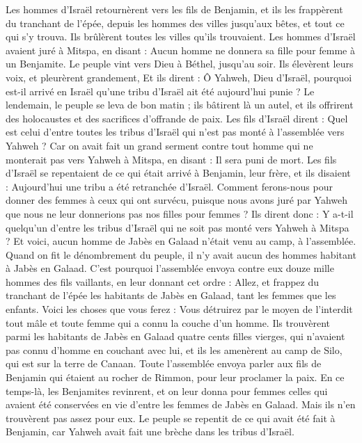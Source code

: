 \begin{multicols}{2}
Les hommes d'Israël retournèrent vers les fils de Benjamin, et ils les frappèrent du tranchant de l'épée, depuis les hommes des villes jusqu'aux bêtes, et tout ce qui s'y trouva. Ils brûlèrent toutes les villes qu'ils trouvaient.
\VerseOne{}Les hommes d'Israël avaient juré à Mitspa, en disant : Aucun homme ne donnera sa fille pour femme à un Benjamite.
Le peuple vint vers Dieu à Béthel, jusqu'au soir. Ils élevèrent leurs voix, et pleurèrent grandement,
Et ils dirent : Ô Yahweh, Dieu d'Israël, pourquoi est-il arrivé en Israël qu'une tribu d'Israël ait été aujourd'hui punie ?
Le lendemain, le peuple se leva de bon matin ; ils bâtirent là un autel, et ils offrirent des holocaustes et des sacrifices d'offrande de paix.
Les fils d'Israël dirent : Quel est celui d'entre toutes les tribus d'Israël qui n'est pas monté à l'assemblée vers Yahweh ? Car on avait fait un grand serment contre tout homme qui ne monterait pas vers Yahweh à Mitspa, en disant : Il sera puni de mort.
Les fils d'Israël se repentaient de ce qui était arrivé à Benjamin, leur frère, et ils disaient : Aujourd'hui une tribu a été retranchée d'Israël.
Comment ferons-nous pour donner des femmes à ceux qui ont survécu, puisque nous avons juré par Yahweh que nous ne leur donnerions pas nos filles pour femmes ?
Ils dirent donc : Y a-t-il quelqu'un d'entre les tribus d'Israël qui ne soit pas monté vers Yahweh à Mitspa ? Et voici, aucun homme de Jabès en Galaad n'était venu au camp, à l'assemblée.
Quand on fit le dénombrement du peuple, il n'y avait aucun des hommes habitant à Jabès en Galaad.
C'est pourquoi l'assemblée envoya contre eux douze mille hommes des fils vaillants, en leur donnant cet ordre : Allez, et frappez du tranchant de l'épée les habitants de Jabès en Galaad, tant les femmes que les enfants.
Voici les choses que vous ferez : Vous détruirez par le moyen de l'interdit tout mâle et toute femme qui a connu la couche d'un homme.
Ils trouvèrent parmi les habitants de Jabès en Galaad quatre cents filles vierges, qui n'avaient pas connu d'homme en couchant avec lui, et ils les amenèrent au camp de Silo, qui est sur la terre de Canaan.
Toute l'assemblée envoya parler aux fils de Benjamin qui étaient au rocher de Rimmon,  pour leur proclamer la paix.
En ce temps-là, les Benjamites revinrent, et on leur donna pour femmes celles qui avaient été conservées en vie d'entre les femmes de Jabès en Galaad. Mais ils n’en trouvèrent pas assez pour eux.
Le peuple se repentit de ce qui avait été fait à Benjamin, car Yahweh avait fait une brèche dans les tribus d'Israël.

\end{multicols}
